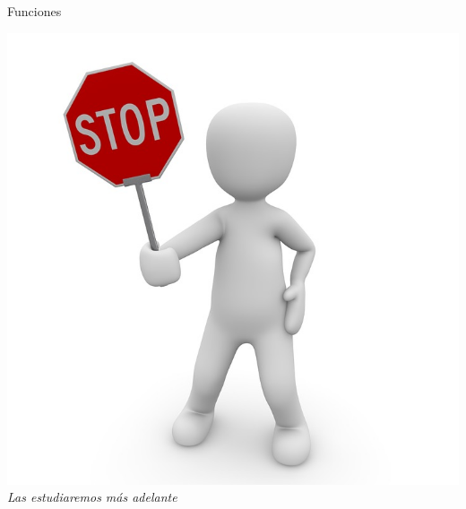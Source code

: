 \documentclass{bredelebeamer}
\begin{document}
\begin{frame}{Funciones}
\begin{center}
\includegraphics[scale=0.2]{images/stop.jpg}
\\\textit{Las estudiaremos más adelante}
\end{center}
\end{frame}
\end{document}
